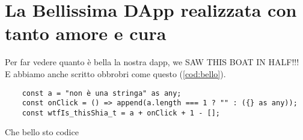 \section{La Bellissima DApp realizzata con tanto amore e cura}
Per far vedere quanto è bella la nostra \gls{dapp}, we SAW THIS BOAT IN HALF!!! \\

E abbiamo anche scritto obbrobri come questo (\autoref{cod:bello}).
\begin{listing}[h]

    \begin{verbatim}
    const a = "non è una stringa" as any;
    const onClick = () => append(a.length === 1 ? "" : ({} as any));
    const wtfIs_thisShia_t = a + onClick + 1 - [];
    \end{verbatim}
    \caption{Che bello sto codice \label{cod:bello}}
\end{listing}